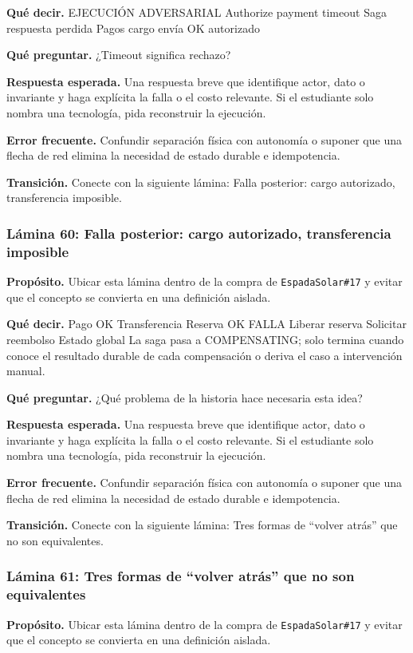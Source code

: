 \documentclass[variant=docente,cover=institutional,mode=screen]{ua-engineering-v6-article}
\begin{document}
\textbf{Qué decir.} EJECUCIÓN ADVERSARIAL Authorize payment timeout Saga respuesta perdida Pagos cargo envía OK autorizado

\textbf{Qué preguntar.} ¿Timeout significa rechazo?

\textbf{Respuesta esperada.} Una respuesta breve que identifique actor, dato o invariante y haga explícita la falla o el costo relevante. Si el estudiante solo nombra una tecnología, pida reconstruir la ejecución.

\textbf{Error frecuente.} Confundir separación física con autonomía o suponer que una flecha de red elimina la necesidad de estado durable e idempotencia.

\textbf{Transición.} Conecte con la siguiente lámina: Falla posterior: cargo autorizado, transferencia imposible.

\subsubsection*{Lámina 60: Falla posterior: cargo autorizado, transferencia imposible}
\textbf{Propósito.} Ubicar esta lámina dentro de la compra de \texttt{EspadaSolar\#17} y evitar que el concepto se convierta en una definición aislada.

\textbf{Qué decir.} Pago OK Transferencia Reserva OK FALLA Liberar reserva Solicitar reembolso Estado global La saga pasa a COMPENSATING; solo termina cuando conoce el resultado durable de cada compensación o deriva el caso a intervención manual.

\textbf{Qué preguntar.} ¿Qué problema de la historia hace necesaria esta idea?

\textbf{Respuesta esperada.} Una respuesta breve que identifique actor, dato o invariante y haga explícita la falla o el costo relevante. Si el estudiante solo nombra una tecnología, pida reconstruir la ejecución.

\textbf{Error frecuente.} Confundir separación física con autonomía o suponer que una flecha de red elimina la necesidad de estado durable e idempotencia.

\textbf{Transición.} Conecte con la siguiente lámina: Tres formas de “volver atrás” que no son equivalentes.

\subsubsection*{Lámina 61: Tres formas de “volver atrás” que no son equivalentes}
\textbf{Propósito.} Ubicar esta lámina dentro de la compra de \texttt{EspadaSolar\#17} y evitar que el concepto se convierta en una definición aislada.
\end{document}
